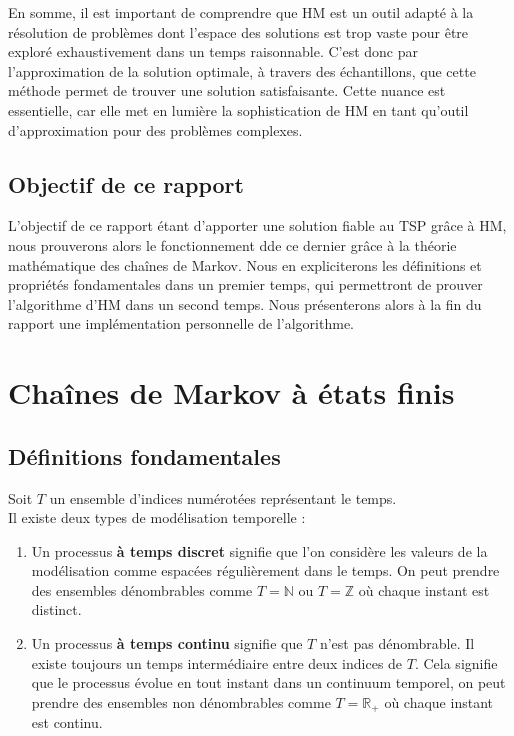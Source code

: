 \documentclass{article}
\begin{document}
En somme, il est important de comprendre que HM est un outil adapté à la résolution de problèmes dont l'espace des solutions est trop vaste pour être exploré exhaustivement dans un temps raisonnable. C'est donc par l'approximation de la solution optimale, à travers des échantillons, que cette méthode permet de trouver une solution satisfaisante.
Cette nuance est essentielle, car elle met en lumière la sophistication de HM en tant qu'outil d'approximation pour des problèmes complexes.

\subsection{Objectif de ce rapport}

L'objectif de ce rapport étant d'apporter une solution fiable au TSP grâce à HM, nous prouverons alors le fonctionnement dde ce dernier grâce à la théorie mathématique des chaînes de Markov. Nous en expliciterons les définitions et propriétés fondamentales dans un premier temps, qui permettront de prouver l'algorithme d'HM dans un second temps. Nous présenterons alors à la fin du rapport une implémentation personnelle de l'algorithme.


\newpage %
\section{Chaînes de Markov à états finis}

\subsection{Définitions fondamentales}

\begin{tcolorbox}[colback=white,colframe=blue!80!black,title=Temps Discret et Temps Continu]
Soit $T$ un ensemble d'indices numérotées représentant le temps. \\

Il existe deux types de modélisation temporelle :
\begin{enumerate}[leftmargin=5em, label=(\arabic*)]
    \item Un processus \textbf{à temps discret} signifie que l'on considère les valeurs de la modélisation comme espacées régulièrement dans le temps.
          On peut prendre des ensembles dénombrables comme $T = \mathbb{N}$ ou $T = \mathbb{Z}$ où chaque instant est distinct.
    \item Un processus \textbf{à temps continu} signifie que $T$ n'est pas dénombrable. Il existe toujours un temps intermédiaire entre deux indices de $T$.
          Cela signifie que le processus évolue en tout instant dans un continuum temporel, on peut prendre des ensembles non dénombrables comme $T = \mathbb{R}_+$ où chaque instant est continu.
\end{enumerate}
\end{tcolorbox}
\end{document}
